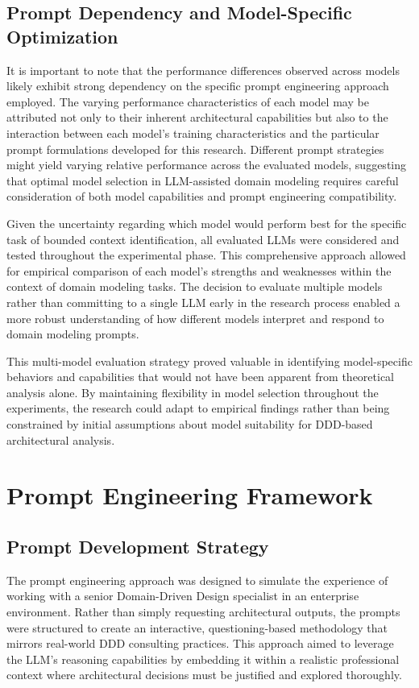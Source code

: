 \subsection{Prompt Dependency and Model-Specific Optimization}
It is important to note that the performance differences observed across models likely exhibit strong dependency on the specific prompt engineering approach employed. The varying performance characteristics of each model may be attributed not only to their inherent architectural capabilities but also to the interaction between each model's training characteristics and the particular prompt formulations developed for this research. Different prompt strategies might yield varying relative performance across the evaluated models, suggesting that optimal model selection in LLM-assisted domain modeling requires careful consideration of both model capabilities and prompt engineering compatibility.

Given the uncertainty regarding which model would perform best for the specific task of bounded context identification, all evaluated LLMs were considered and tested throughout the experimental phase. This comprehensive approach allowed for empirical comparison of each model's strengths and weaknesses within the context of domain modeling tasks. The decision to evaluate multiple models rather than committing to a single LLM early in the research process enabled a more robust understanding of how different models interpret and respond to domain modeling prompts.

This multi-model evaluation strategy proved valuable in identifying model-specific behaviors and capabilities that would not have been apparent from theoretical analysis alone. By maintaining flexibility in model selection throughout the experiments, the research could adapt to empirical findings rather than being constrained by initial assumptions about model suitability for DDD-based architectural analysis.

\section{Prompt Engineering Framework}

\subsection{Prompt Development Strategy}
The prompt engineering approach was designed to simulate the experience of working with a senior Domain-Driven Design specialist in an enterprise environment. Rather than simply requesting architectural outputs, the prompts were structured to create an interactive, questioning-based methodology that mirrors real-world DDD consulting practices. This approach aimed to leverage the LLM's reasoning capabilities by embedding it within a realistic professional context where architectural decisions must be justified and explored thoroughly.


